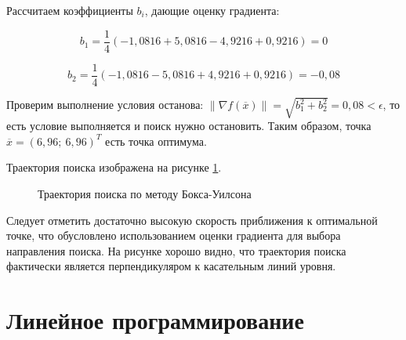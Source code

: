 \documentclass[a4paper,12pt]{report}
\begin{document}
Рассчитаем коэффициенты $b_{i}$, дающие оценку градиента:

\begin{equation*}
b_{1} = \frac{1}{4}\left(-1,0816 + 5,0816 - 4,9216 + 0,9216\right) = 0
\end{equation*}

\begin{equation*}
b_{2} = \frac{1}{4}\left(-1,0816 - 5,0816 + 4,9216 + 0,9216\right) = -0,08
\end{equation*}

Проверим выполнение условия останова: $\left\|\nabla f(\overline{x})\right\| = \sqrt{b^{2}_{1} + b^{2}_{2}} = 0,08 < \epsilon$, то есть условие выполняется и поиск нужно остановить. Таким образом, точка $\overline{x} = (6,96;\ 6,96)^{T}$ есть точка оптимума.

Траектория поиска изображена на рисунке \ref{fig:example_bw_graph}.

\newpage

\begin{figure}[ht]
\caption{Траектория поиска по методу Бокса-Уилсона}
\label{fig:example_bw_graph}
\end{figure}

Следует отметить достаточно высокую скорость приближения к оптимальной точке, что обусловлено использованием оценки градиента для выбора направления поиска. На рисунке хорошо видно, что траектория поиска фактически является перпендикуляром к касательным линий уровня.

\clearpage

\chapter{Линейное программирование}
\end{document}

